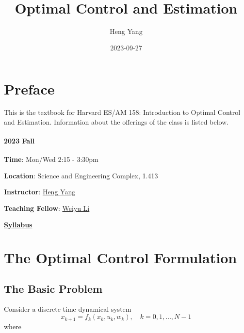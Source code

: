 \documentclass[
]{book}
\title{Optimal Control and Estimation}
\author{Heng Yang}
\date{2023-09-27}
\theoremstyle{definition}
\theoremstyle{definition}
\theoremstyle{definition}
\theoremstyle{definition}
\theoremstyle{remark}
\begin{document}
\maketitle

{
\setcounter{tocdepth}{1}
\tableofcontents
}
\hypertarget{preface}{%
\chapter*{Preface}\label{preface}}

This is the textbook for Harvard ES/AM 158: Introduction to Optimal Control and Estimation. Information about the offerings of the class is listed below.

\hypertarget{fall}{%
\subsubsection*{2023 Fall}\label{fall}}

\textbf{Time}: Mon/Wed 2:15 - 3:30pm

\textbf{Location}: Science and Engineering Complex, 1.413

\textbf{Instructor}: \href{https://hankyang.seas.harvard.edu/}{Heng Yang}

\textbf{Teaching Fellow}: \href{https://scholar.harvard.edu/weiyuli/home}{Weiyu Li}

\href{https://docs.google.com/document/d/1q8_jB5dLx9jHOBi3DQ48Vv2E243ocGCGm_H0mJuOojM/edit?usp=sharing}{\textbf{Syllabus}}

\hypertarget{formulation}{%
\chapter{The Optimal Control Formulation}\label{formulation}}

\hypertarget{the-basic-problem}{%
\section{The Basic Problem}\label{the-basic-problem}}

Consider a discrete-time dynamical system
\begin{equation}
x_{k+1} = f_k (x_k, u_k, w_k), \quad k =0,1,\dots,N-1
\label{eq:discrete-time-dynamics}
\end{equation}
where
\end{document}
